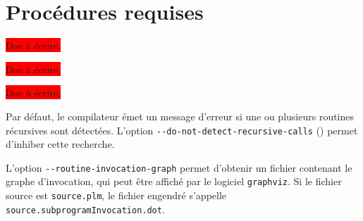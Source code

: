 

\section{Procédures requises}

\colorbox{red}{Doc à écrire.}



\colorbox{red}{Doc à écrire.}



\colorbox{red}{Doc à écrire.}















Par défaut, le compilateur émet un message d'erreur si une ou plusieurs routines récursives sont détectées. L'option \texttt{-{}-do-not-detect-recursive-calls} () permet d'inhiber cette recherche.

L'option \texttt{-{}-routine-invocation-graph} permet d'obtenir un fichier contenant le graphe d'invocation, qui peut être affiché par le logiciel \texttt{graphviz}. Si le fichier source est \texttt{source.plm}, le fichier engendré s'appelle \texttt{source.subprogramInvocation.dot}.


